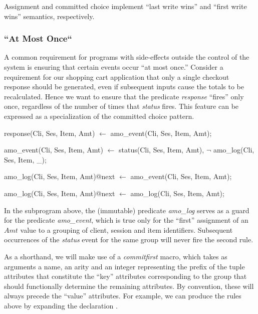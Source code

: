 Assignment and committed choice implement ``last write wins'' and 
``first write wins'' semantics, respectively.

\subsubsection{``At Most Once``}
\label{sec:atmostonce}
A common requirement for programs with side-effects outside the control
of the system is ensuring that certain events occur ``at most once.''
Consider a requirement for our shopping cart application 
that only a single checkout response should be generated, even if subsequent
inputs cause the totals to be recalculated.  Hence we want to ensure that the
predicate {\em response} ``fires'' only once, regardless of the number of times 
that {\em status} fires.  This feature can be expressed as a 
specialization of the committed choice pattern.   

\begin{Dedalus}
response(Cli, Ses, Item, Amt) \(\leftarrow\)
  amo\_event(Cli, Ses, Item, Amt);

amo\_event(Cli, Ses, Item, Amt) \(\leftarrow\)
  status(Cli, Ses, Item, Amt), 
  \(\lnot\) amo\_log(Cli, Ses, Item, _);

amo\_log(Cli, Ses, Item, Amt)@next \(\leftarrow\) 
  amo\_event(Cli, Ses, Item, Amt);

amo\_log(Cli, Ses, Item, Amt)@next \(\leftarrow\) 
  amo\_log(Cli, Ses, Item, Amt);
\end{Dedalus}

In the subprogram above, the (immutable) predicate {\em amo\_log} serves as a guard
for the predicate {\em amo\_event}, which is true only for the ``first'' assignment
of an $Amt$ value to a grouping of client, session and item identifiers.  Subsequent
occurrences of the {\em status} event for the same group will never fire the second rule.

As a shorthand, we will make use of a {\em commitfirst} macro, which takes as arguments a name,
an arity and an integer representing the prefix of the tuple attributes that constitute the
``key'' attributes corresponding to the group that should functionally determine the remaining
attributes.  By convention, these will always precede the ``value'' attributes.  For example,
we can produce the rules above by expanding the declaration .


